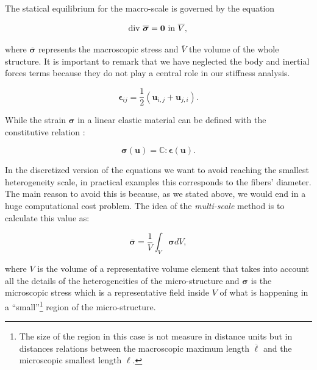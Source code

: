 \documentclass[preprint]{elsarticle}
\begin{document}
The statical equilibrium for the macro-scale is governed by the equation

\begin{equation}
\text{div } \overline{\bm{\sigma}} = \bm{0} \text{ in } \overline{V},\\
\label{eq:macro_equil}
\end{equation}

\noindent
where $\overline{\bm{\sigma}}$ represents the macroscopic stress and
$\overline{V}$ the volume of the whole structure. It is important to remark that
we have neglected the body and inertial forces terms because they do not
play a central role in our stiffness analysis.

\begin{equation}
 \bm{\epsilon}_{ij} = \frac{1}{2}\left( \bm{u}_{i,j} + \bm{u}_{j,i} \right).
\label{eq:constitutive}
\end{equation}

While the strain $\bm{\sigma}$ in a linear elastic material can be defined with the 
constitutive relation :

\begin{equation}
\bm{\sigma}(\bm{u}) = \mathbb{C} : \bm{\epsilon}(\bm{u}).
\label{eq:constitutive}
\end{equation}

In the discretized version of the equations we want to avoid reaching 
the smallest heterogeneity scale, in practical examples this corresponds 
to the fibers' diameter. The main reason to avoid this is because, as we 
stated above, we would end in a huge computational cost problem.
The idea of the \emph{multi-scale} method is to calculate this value
as:

\begin{equation}
\overline{\bm{\sigma}} = \frac{1}{V} \int_{V} \bm{\sigma} dV,
\label{stress_ave}
\end{equation}

\noindent
where $V$ is the volume of a
representative volume element that takes into account all the details of the
heterogeneities of the micro-structure and $\bm{\sigma}$ is the microscopic
stress which is a representative field inside $V$ of what is happening in a
``small''\footnote{The size of the region in this case is not measure in
distance units but in distances relations between the macroscopic maximum length
$\overline{\ell}$ and the microscopic smallest length $\ell$.} region of the micro-structure.
\end{document}
